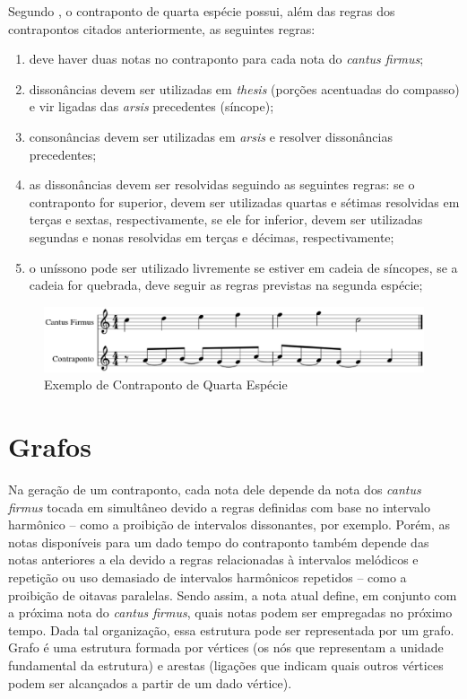         Segundo , o contraponto de quarta espécie possui, além das regras dos contrapontos citados anteriormente, as seguintes regras:

        \begin{enumerate}
          \item deve haver duas notas no contraponto para cada nota do \textit{cantus firmus};
          \item dissonâncias devem ser utilizadas em \textit{thesis} (porções acentuadas do compasso) e vir ligadas das \textit{arsis} precedentes (síncope);
          \item consonâncias devem ser utilizadas em \textit{arsis} e resolver dissonâncias precedentes;
          \item as dissonâncias devem ser resolvidas seguindo as seguintes regras: se o contraponto for superior, devem ser utilizadas quartas e sétimas resolvidas em terças e sextas, respectivamente, se ele for inferior, devem ser utilizadas segundas e nonas resolvidas em terças e décimas, respectivamente;
          \item o uníssono pode ser utilizado livremente se estiver em cadeia de síncopes, se a cadeia for quebrada, deve seguir as regras previstas na segunda espécie;
        \end{enumerate}

        \begin{figure}[htb]
          \centering
          \includegraphics[scale=0.55]{figuras/contrapontoquarta.eps}
          \caption{Exemplo de Contraponto de Quarta Espécie}
          \label{contrapontoquarta}
        \end{figure}

  \section[Grafos]{Grafos}

    Na geração de um contraponto, cada nota dele depende da nota dos \textit{cantus firmus} tocada em simultâneo devido a regras definidas com base no intervalo harmônico -- como a proibição de intervalos dissonantes, por exemplo. Porém, as notas disponíveis para um dado tempo do contraponto também depende das notas anteriores a ela devido a regras relacionadas à intervalos melódicos e repetição ou uso demasiado de intervalos harmônicos repetidos -- como a proibição de oitavas paralelas. Sendo assim, a nota atual define, em conjunto com a próxima nota do \textit{cantus firmus}, quais notas podem ser empregadas no próximo tempo. Dada tal organização, essa estrutura pode ser representada por um grafo.
    Grafo é uma estrutura formada por vértices (os nós que representam a unidade fundamental da estrutura) e arestas (ligações que indicam quais outros vértices podem ser alcançados a partir de um dado vértice).

